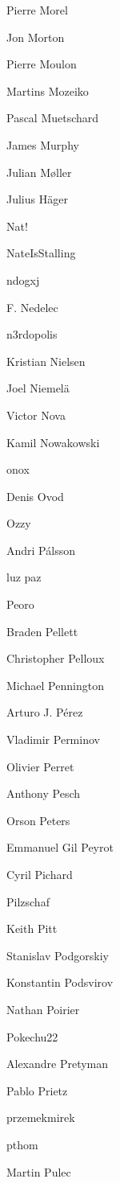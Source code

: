 \begin{DoxyItemize}
\item Pierre Morel
\item Jon Morton
\item Pierre Moulon
\item Martins Mozeiko
\item Pascal Muetschard
\item James Murphy
\item Julian Møller
\item Julius Häger
\item Nat!
\item Nate\+Is\+Stalling
\item ndogxj
\item F. Nedelec
\item n3rdopolis
\item Kristian Nielsen
\item Joel Niemelä
\item Victor Nova
\item Kamil Nowakowski
\item onox
\item Denis Ovod
\item Ozzy
\item Andri Pálsson
\item luz paz
\item Peoro
\item Braden Pellett
\item Christopher Pelloux
\item Michael Pennington
\item Arturo J. Pérez
\item Vladimir Perminov
\item Olivier Perret
\item Anthony Pesch
\item Orson Peters
\item Emmanuel Gil Peyrot
\item Cyril Pichard
\item Pilzschaf
\item Keith Pitt
\item Stanislav Podgorskiy
\item Konstantin Podsvirov
\item Nathan Poirier
\item Pokechu22
\item Alexandre Pretyman
\item Pablo Prietz
\item przemekmirek
\item pthom
\item Martin Pulec

\end{DoxyItemize}
